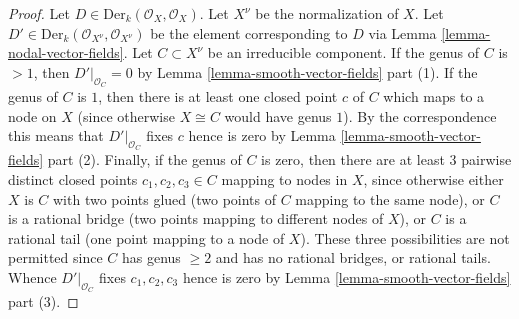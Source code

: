 \begin{proof}
Let $D \in \text{Der}_k(\mathcal{O}_X, \mathcal{O}_X)$.
Let $X^\nu$ be the normalization of $X$.
Let $D' \in \text{Der}_k(\mathcal{O}_{X^\nu}, \mathcal{O}_{X^\nu})$
be the element corresponding to $D$ via Lemma \ref{lemma-nodal-vector-fields}.
Let $C \subset X^\nu$ be an irreducible component.
If the genus of $C$ is $> 1$, then $D'|_{\mathcal{O}_C} = 0$
by Lemma \ref{lemma-smooth-vector-fields} part (1).
If the genus of $C$ is $1$, then there is at least one closed point $c$ of $C$
which maps to a node on $X$ (since otherwise $X \cong C$ would have genus $1$).
By the correspondence this means that
$D'|_{\mathcal{O}_C}$ fixes $c$ hence is zero by
Lemma \ref{lemma-smooth-vector-fields} part (2).
Finally, if the genus of $C$ is zero, then there are at least
$3$ pairwise distinct closed points $c_1, c_2, c_3 \in C$
mapping to nodes in $X$, since otherwise either
$X$ is $C$ with two points glued (two points of $C$ mapping
to the same node), or
$C$ is a rational bridge (two points mapping to different nodes of $X$), or
$C$ is a rational tail (one point mapping to a node of $X$).
These three possibilities are not permitted since
$C$ has genus $\geq 2$ and has no rational bridges, or rational tails.
Whence $D'|_{\mathcal{O}_C}$ fixes $c_1, c_2, c_3$ hence is zero by
Lemma \ref{lemma-smooth-vector-fields} part (3).
\end{proof}











